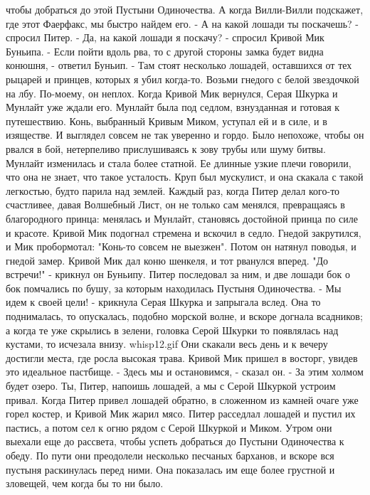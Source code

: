 чтобы добраться до этой Пустыни Одиночества. А когда Вилли-Вилли 
подскажет, где этот Фаерфакс, мы быстро найдем его.
    - А на какой лошади ты поскачешь? - спросил Питер.
    - Да, на какой лошади я поскачу? - спросил Кривой Мик Буньипа.
    - Если пойти вдоль рва, то с другой стороны замка будет видна 
конюшня, - ответил Буньип. - Там стоят несколько лошадей, оставшихся 
от тех рыцарей и принцев, которых я убил когда-то. Возьми гнедого с 
белой звездочкой на лбу. По-моему, он неплох.
    Когда Кривой Мик вернулся, Серая Шкурка и Мунлайт уже ждали его. 
Мунлайт была под седлом, взнузданная и готовая к путешествию. Конь, 
выбранный Кривым Миком, уступал ей и в силе, и в изяществе. И выглядел 
совсем не так уверенно и гордо. Было непохоже, чтобы он рвался в бой, 
нетерпеливо прислушиваясь к зову трубы или шуму битвы.
    Мунлайт изменилась и стала более статной. Ее длинные узкие плечи 
говорили, что она не знает, что такое усталость. Круп был мускулист, и 
она скакала с такой легкостью, будто парила над землей. Каждый раз, 
когда Питер делал кого-то счастливее, давая Волшебный Лист, он не 
только сам менялся, превращаясь в благородного принца: менялась и 
Мунлайт, становясь достойной принца по силе и красоте.
    Кривой Мик подогнал стремена и вскочил в седло. Гнедой закрутился, 
и Мик пробормотал: "Конь-то совсем не выезжен". Потом он натянул 
поводья, и гнедой замер.
    Кривой Мик дал коню шенкеля, и тот рванулся вперед. "До встречи!" 
- крикнул он Буньипу. Питер последовал за ним, и две лошади бок о бок 
помчались по бушу, за которым находилась Пустыня Одиночества.
    - Мы идем к своей цели! - крикнула Серая Шкурка и запрыгала вслед. 
Она то поднималась, то опускалась, подобно морской волне, и вскоре 
догнала всадников; а когда те уже скрылись в зелени, головка Серой 
Шкурки то появлялась над кустами, то исчезала внизу.
    {whisp12.gif}
    Они скакали весь день и к вечеру достигли места, где росла высокая 
трава. Кривой Мик пришел в восторг, увидев это идеальное пастбище.
    - Здесь мы и остановимся, - сказал он. - За этим холмом будет 
озеро. Ты, Питер, напоишь лошадей, а мы с Серой Шкуркой устроим 
привал.
    Когда Питер привел лошадей обратно, в сложенном из камней очаге 
уже горел костер, и Кривой Мик жарил мясо. Питер расседлал лошадей и 
пустил их пастись, а потом сел к огню рядом с Серой Шкуркой и Миком.
    Утром они выехали еще до рассвета, чтобы успеть добраться до 
Пустыни Одиночества к обеду. По пути они преодолели несколько песчаных 
барханов, и вскоре вся пустыня раскинулась перед ними. Она показалась 
им еще более грустной и зловещей, чем когда бы то ни было.
